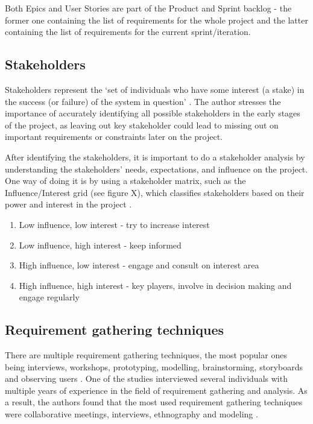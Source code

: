 Both Epics and User Stories are part of the Product and Sprint backlog - the former one containing the list of requirements for the whole project and the latter containing the list of requirements for the current sprint/iteration.

\subsection{Stakeholders}

Stakeholders represent the `set of individuals who have some interest (a stake) in the success (or failure) of the system in question' \parencite[34]{requirements}. The author stresses the importance of accurately identifying all possible stakeholders in the early stages of the project, as leaving out key stakeholder could lead to missing out on important requirements or constraints later on the project. 

After identifying the stakeholders, it is important to do a stakeholder analysis by understanding the stakeholders' needs, expectations, and influence on the project. One way of doing it is by using a stakeholder matrix, such as the Influence/Interest grid (see figure X), which classifies stakeholders based on their power and interest in the project \parencite{stakeholders}.


\begin{enumerate}
    \item Low influence, low interest - try to increase interest
    \item Low influence, high interest - keep informed 
    \item High influence, low interest - engage and consult on interest area
    \item High influence, high interest - key players, involve in decision making and engage regularly
\end{enumerate}

\subsection{Requirement gathering techniques}

There are multiple requirement gathering techniques, the most popular ones being interviews, workshops, prototyping, modelling, brainstorming, storyboards and observing users \parencite{reqanalysis1,reqanalysis2, reqanalysis3, reqanalysis4}. One of the studies interviewed several individuals with multiple years of experience in the field of requirement gathering and analysis. As a result, the authors found that the most used requirement gathering techniques were collaborative meetings, interviews, ethnography and modeling \parencite{reqanalysis1}.

